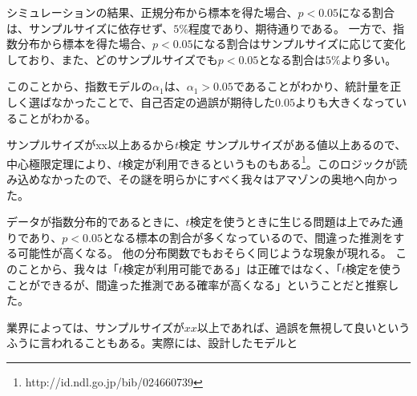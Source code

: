 シミュレーションの結果、正規分布から標本を得た場合、$p<0.05$になる割合は、サンプルサイズに依存せず、$5\%$程度であり、期待通りである。
一方で、指数分布から標本を得た場合、$p<0.05$になる割合はサンプルサイズに応じて変化しており、また、どのサンプルサイズでも$p<0.05$となる割合は$5\%$より多い。

このことから、指数モデルの$\alpha_1$は、$\alpha_1>0.05$であることがわかり、統計量を正しく選ばなかったことで、自己否定の過誤が期待した$0.05$よりも大きくなっていることがわかる。


\begin{SMbox}{サンプルサイズがxx以上あるから$t$検定}
        サンプルサイズがある値以上あるので、中心極限定理により、$t$検定が利用できるというものもある\footnote{http://id.ndl.go.jp/bib/024660739}。このロジックが読み込めなかったので、その謎を明らかにすべく我々はアマゾンの奥地へ向かった。

        データが指数分布的であるときに、$t$検定を使うときに生じる問題は上でみた通りであり、$p<0.05$となる標本の割合が多くなっているので、間違った推測をする可能性が高くなる。
        他の分布関数でもおそらく同じような現象が現れる。
        このことから、我々は「$t$検定が利用可能である」は正確ではなく、「$t$検定を使うことができるが、間違った推測である確率が高くなる」ということだと推察した。

        業界によっては、サンプルサイズが$xx$以上であれば、過誤を無視して良いというふうに言われることもある。実際には、設計したモデルと
\end{SMbox}

